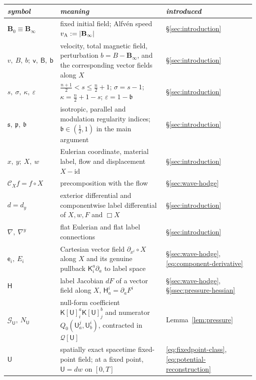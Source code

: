 \documentclass[11pt,reqno]{amsart}
\theoremstyle{plain}
\theoremstyle{definition}
\theoremstyle{remark}
\numberwithin{equation}{section}
\newcommand{\breg}{\mathfrak b}
\newcommand{\sreg}{\mathfrak s}
\newcommand{\preg}{\mathfrak p}
\newcommand{\Ufield}{\mathsf U}
\newcommand{\Kmat}{\mathsf K}
\newcommand{\Ccoef}{\mathcal G}   %
\newcommand{\Hess}{\mathsf H}     %
\newcommand{\eframe}{\mathsf e}   %
\newcommand{\vLag}{\mathsf v}
\newcommand{\BLag}{\mathsf B}
\newcommand{\bLag}{\mathsf b}
\newcommand{\Bzero}{\mathbf B_0}
\newcommand{\Binf}{\mathbf B_\infty}
\begin{document}
\begingroup\small
\setlength{\LTleft}{0pt}\setlength{\LTright}{0pt}
\begin{table}[htbp]
  \centering
  \small
  \renewcommand{\arraystretch}{0.85}
  
  \begin{tabular}{@{}>{\raggedright\arraybackslash}p{}>{\raggedright\arraybackslash}p{}>{\raggedright\arraybackslash}p{}@{}}
    \hline
\emph{symbol} & \emph{meaning} & \emph{introduced} \\ \hline
$\Bzero\equiv\Binf$ & fixed initial field; Alfv\'en speed $v_{\rm A}:=|\Binf|$ & \S\ref{sec:introduction} \\
$v,\ B,\ b;\ \vLag,\ \BLag,\ \bLag$ & velocity, total magnetic field, perturbation $b=B-\Binf$, and the corresponding vector fields along $X$ & \S\ref{sec:introduction} \\
$s,\ \sigma,\ \kappa,\ \varepsilon$ & $\frac{n+1}2<s\le\frac n2+1$; $\sigma=s-1$; $\kappa=\frac n2+1-s$; $\varepsilon=1-\breg$ & \S\ref{sec:introduction} \\
$\sreg,\ \preg,\ \breg$ & isotropic, parallel and modulation regularity indices; $\breg\in(\frac12,1)$ in the main argument & \S\ref{sec:introduction} \\
$x,\ y;\ X,\ w$ & Eulerian coordinate, material label, flow and displacement $X-\mathrm{id}$ & \S\ref{sec:introduction} \\
$\mathcal C_Xf=f\circ X$ & precomposition with the flow & \S\ref{sec:wave-hodge} \\
$d=d_{y}$ & exterior differential and componentwise label differential of $X,w,F$ and $\Box X$ & \S\ref{sec:introduction} \\
$\nabla,\ \nabla^{y}$ & flat Eulerian and flat label connections & \S\ref{sec:introduction} \\
$\eframe_i,\ E_i$ & Cartesian vector field $\partial_{x^i}\circ X$ along $X$ and its genuine pullback $\Kmat^a_i\partial_a$ to label space & \S\ref{sec:wave-hodge}, \eqref{eq:component-derivative} \\
$\Hess$ & label Jacobian $dF$ of a vector field along $X$, $\Hess_a^i=\partial_aF^i$ & \S\ref{sec:wave-hodge}, \S\ref{ssec:pressure-hessian} \\
$\Ccoef_{\Ufield},\ N_{\Ufield}$ & null-form coefficient $\Kmat[\Ufield]^a_i\Kmat[\Ufield]^b_j$ and numerator $Q_0(\Ufield_a^j,\Ufield_b^i)$, contracted in $\mathcal Q[\Ufield]$ & Lemma~\ref{lem:pressure} \\
$\Ufield$ & spatially exact spacetime fixed-point field; at a fixed point, $\Ufield=dw$ on $[0,T]$ & \eqref{eq:fixedpoint-class}, \eqref{eq:potential-reconstruction} \\

\end{tabular}
\end{table}
\end{document}
